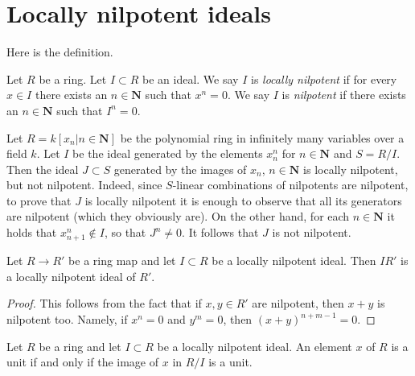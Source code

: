 \section{Locally nilpotent ideals}
\label{section-locally-nilpotent}

\noindent
Here is the definition.

\begin{definition}
\label{definition-locally-nilpotent-ideal}
Let $R$ be a ring. Let $I \subset R$ be an ideal.
We say $I$ is {\it locally nilpotent} if for every
$x \in I$ there exists an $n \in \mathbf{N}$ such
that $x^n = 0$. We say $I$ is {\it nilpotent} if
there exists an $n \in \mathbf{N}$ such that $I^n = 0$.
\end{definition}

\begin{example}
\label{example-locally-nilpotent-not-nilpotent}
Let $R = k[x_n | n \in \mathbf{N}]$ be the polynomial ring in infinitely
many variables over a field $k$. Let $I$ be the ideal generated by
the elements $x_n^n$ for $n \in \mathbf{N}$ and $S = R/I$. Then the ideal
$J \subset S$ generated by the images of $x_n$, $n \in \mathbf{N}$
is locally nilpotent, but not nilpotent. Indeed, since $S$-linear
combinations of nilpotents are nilpotent, to prove that $J$ is locally
nilpotent it is enough to observe that all its generators are nilpotent
(which they obviously are). On the other hand, for each $n \in \mathbf{N}$
it holds that $x_{n + 1}^n \not \in I$, so that $J^n \not = 0$.
It follows that $J$ is not nilpotent.
\end{example}

\begin{lemma}
\label{lemma-locally-nilpotent}
Let $R \to R'$ be a ring map and let $I \subset R$ be a locally nilpotent
ideal. Then $IR'$ is a locally nilpotent ideal of $R'$.
\end{lemma}

\begin{proof}
This follows from the fact that if $x, y \in R'$ are nilpotent, then
$x + y$ is nilpotent too. Namely, if $x^n = 0$ and $y^m = 0$, then
$(x + y)^{n + m - 1} = 0$.
\end{proof}

\begin{lemma}
\label{lemma-locally-nilpotent-unit}
Let $R$ be a ring and let $I \subset R$ be a locally nilpotent
ideal.
An element $x$ of $R$ is a unit if and only if the image of $x$
in $R/I$ is a unit.
\end{lemma}

